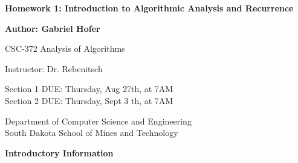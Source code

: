 \documentclass[8pt, a4paper]{article}
\begin{document}
\begin{titlepage}
   \begin{center}
       \vspace*{1cm}
       \large
       \textbf{Homework 1: Introduction to Algorithmic Analysis and Recurrence}
       \normalsize

       \vspace{0.5cm}

       \textbf{Author: Gabriel Hofer}

       \vspace{0.5cm}

       CSC-372 Analysis of Algorithms

       \vspace{0.5cm}

       Instructor: Dr. Rebenitsch

       \vspace{0.5cm}

       Section 1 DUE: Thursday, Aug 27th, at 7AM \\ 
       Section 2 DUE: Thursday, Sept 3 th, at 7AM  

       \vfill

       Department of Computer Science and Engineering\\
       South Dakota School of Mines and Technology\\

   \end{center}
\end{titlepage}
\newpage
\textbf{Introductory Information}
\end{document}
